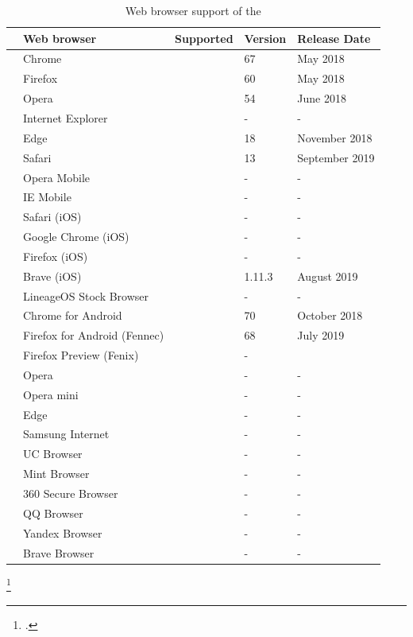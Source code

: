 \begin{table}[ht]
	\begin{tabularx}{\textwidth}{l|p{5.3cm}|p{2cm}|p{1.7cm}|p{3.08cm}}
		& Web browser & Supported & Version & Release Date \\
		\hline
		\parbox[t]{2mm}{} & Chrome & \OK & 67 & May 2018 \\
		& Firefox & \OK & 60 & May 2018 \\
		& Opera & \OK & 54 & June 2018 \\
		& Internet Explorer & \NOOK & - & - \\
		& Edge & \OK & 18 & November 2018 \\
		& Safari & \OK & 13 & September 2019 \\
		\hline
		\parbox[t]{2mm}{} & Opera Mobile & \NOOK & - & - \\
		& IE Mobile & \NOOK & - & - \\
		& Safari (iOS) & \NOOK & - & - \\
		& Google Chrome (iOS) & \NOOK & - & - \\
		& Firefox (iOS) & \NOOK & - & - \\
		& Brave (iOS) & \OK & 1.11.3 & August 2019 \\
		\hline
		\parbox[t]{2mm}{} & LineageOS Stock Browser & \NOOK & - & - \\
		& Chrome for Android & \OK & 70 & October 2018 \\
		& Firefox for Android (Fennec) & \OK & 68 & July 2019 \\
		& Firefox Preview (Fenix) & \NOOK & - \\
		& Opera & \NOOK & - & - \\
		& Opera mini & \NOOK & - & - \\
		& Edge & \NOOK & - & - \\
		& Samsung Internet & \NOOK & - & - \\
		& UC Browser & \NOOK & - & - \\
		& Mint Browser & \NOOK & - & - \\
		& 360 Secure Browser & \NOOK & - & - \\
		& QQ Browser & \NOOK & - & - \\
		& Yandex Browser & \NOOK & - & - \\
		& Brave Browser & \NOOK & - & -
	\end{tabularx}
	\caption[Web browser support of the \wa]{Web browser support of the \wa\footnotemark}
	\label{tab:browser-support}
\end{table}
\footcitetexts[Sources:][]{chrome-webauthn}{firefox-webauthn}{safari-webauthn}{chrome-android-webauthn}[a detailed analysis of Android browsers is available on the CD in the appendix.]{firefox-android-webauthn}
\newpage


